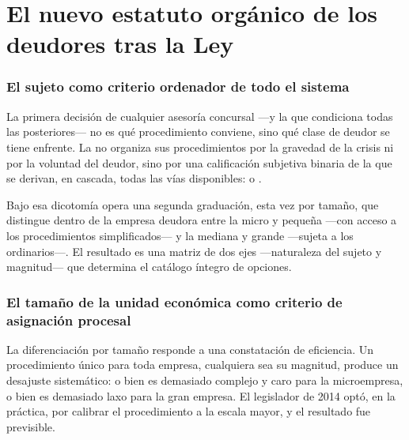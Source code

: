 \chapter{El nuevo estatuto orgánico de los deudores tras la Ley }
\label{cap:estatuto-deudores}


\bloqueTeorico

\subsection{El sujeto como criterio ordenador de todo el sistema}

La primera decisión de cualquier asesoría concursal ---y la que condiciona todas las
posteriores--- no es qué procedimiento conviene, sino qué clase de deudor se tiene enfrente.
La \LIR{} \citeyearpar{ley-20720} no organiza sus procedimientos por la gravedad de la
crisis ni por la voluntad del deudor, sino por una calificación subjetiva binaria de la que
se derivan, en cascada, todas las vías disponibles: \empresadeudora{} o \personadeudora{}.

Bajo esa dicotomía opera una segunda graduación, esta vez por tamaño, que distingue dentro de
la empresa deudora entre la micro y pequeña ---con acceso a los procedimientos
simplificados--- y la mediana y grande ---sujeta a los ordinarios---. El resultado es una
matriz de dos ejes ---naturaleza del sujeto y magnitud--- que determina el catálogo íntegro de
opciones.

\subsection{El tamaño de la unidad económica como criterio de asignación procesal}

La diferenciación por tamaño responde a una constatación de eficiencia. Un procedimiento único
para toda empresa, cualquiera sea su magnitud, produce un desajuste sistemático: o bien es
demasiado complejo y caro para la microempresa, o bien es demasiado laxo para la gran empresa.
El legislador de 2014 optó, en la práctica, por calibrar el procedimiento a la escala mayor, y
el resultado fue previsible.

